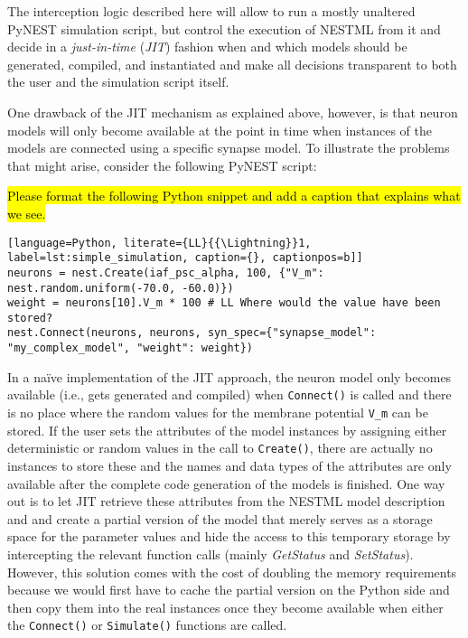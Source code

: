 The interception logic described here will allow to run a mostly unaltered PyNEST simulation script, but control the execution of NESTML from it and decide in a \emph{just-in-time} (\emph{JIT}) fashion when and which models should be generated, compiled, and instantiated and make all decisions transparent to both the user and the simulation script itself.

One drawback of the JIT mechanism as explained above, however, is that neuron models will only become available at the point in time when instances of the models are connected using a specific synapse model. To illustrate the problems that might arise, consider the following PyNEST script:

\hl{Please format the following Python snippet and add a caption that explains what we see.}
\begin{lstlisting}[language=Python, literate={LL}{{\Lightning}}1, label=lst:simple_simulation, caption={}, captionpos=b]]
neurons = nest.Create(iaf_psc_alpha, 100, {"V_m": nest.random.uniform(-70.0, -60.0)})
weight = neurons[10].V_m * 100 # LL Where would the value have been stored?
nest.Connect(neurons, neurons, syn_spec={"synapse_model": "my_complex_model", "weight": weight})
\end{lstlisting}

In a na\"ive implementation of the JIT approach, the neuron model only becomes available (i.e., gets generated and compiled) when \texttt{Connect()} is called and there is no place where the random values for the membrane potential \texttt{V\_m} can be stored. If the user sets the attributes of the model instances by assigning either deterministic or random values in the call to \texttt{Create()}, there are actually no instances to store these and the names and data types of the attributes are only available after the complete code generation of the models is finished. One way out is to let JIT retrieve these attributes from the NESTML model description and and create a partial version of the model that merely serves as a storage space for the parameter values and hide the access to this temporary storage by intercepting the relevant function calls (mainly \emph{GetStatus} and \emph{SetStatus}). However, this solution comes with the cost of doubling the memory requirements because we would first have to cache the partial version on the Python side and then copy them into the real instances once they become available when either the \texttt{Connect()} or \texttt{Simulate()} functions are called.

